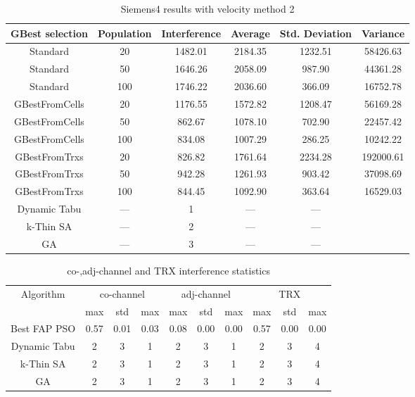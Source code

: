 \begin{table}[H]
\centering
	\begin{tabular}{cccccc}
	\toprule
    GBest selection & Population & Interference & Average & Std. Deviation & Variance \\
    \midrule
    Standard & 20 & 1482.01 & 2184.35 & 1232.51 & 58426.63\\
    Standard & 50 & 1646.26 & 2058.09 & 987.90 & 44361.28\\
    Standard & 100 & 1746.22 & 2036.60 & 366.09 & 16752.78\\
    GBestFromCells & 20 & 1176.55 & 1572.82 & 1208.47 & 56169.28\\
    GBestFromCells & 50 & 862.67 & 1078.10 & 702.90 & 22457.42\\
    GBestFromCells & 100 & 834.08 & 1007.29 & 286.25 & 10242.22\\
    GBestFromTrxs & 20 & 826.82 & 1761.64 & 2234.28 & 192000.61\\
    GBestFromTrxs & 50 & 942.28 & 1261.93 & 903.42 & 37098.69\\
    GBestFromTrxs & 100 & 844.45 & 1092.90 & 363.64 & 16529.03\\
    Dynamic Tabu & --- & 1 & --- & --- \\
    k-Thin SA & --- & 2 & --- & --- \\
    GA & --- & 3 & --- & --- \\
    \bottomrule
	\end{tabular}
\caption{Siemens4 results with velocity method 2}
\label{tab:siem4m2}
\end{table}
\begin{table}[H]
\centering
	\begin{tabular}{cccccccccc}
	\toprule
    Algorithm & \multicolumn{3}{c}{co-channel} & \multicolumn{3}{c}{adj-channel} & \multicolumn{3}{c}{TRX}\\
              & max & std & max
              & max & std & max
              & max & std & max\\
    \midrule
    Best FAP PSO & 0.57 & 0.01 & 0.03 & 0.08 & 0.00 & 0.00 & 0.57 & 0.00 & 0.00\\
    Dynamic Tabu & 2 & 3 & 1 & 2 & 3 & 1 & 2 & 3 & 4\\\hline
    k-Thin SA & 2 & 3 & 1 & 2 & 3 & 1 & 2 & 3 & 4\\\hline
    GA & 2 & 3 & 1 & 2 & 3 & 1 & 2 & 3 & 4\\\hline
    \bottomrule
	\end{tabular}
\caption{co-,adj-channel and TRX interference statistics}
\label{tab:stats-siem4m1}
\end{table}

